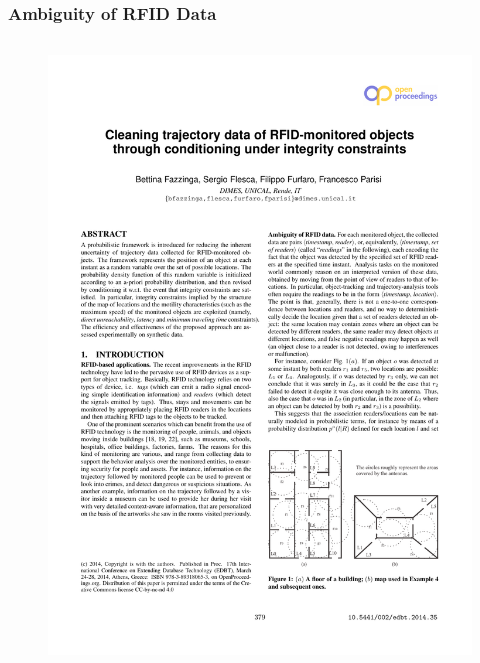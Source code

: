 
\begin{frame}
\frametitle{Ambiguity of RFID Data}

\begin{columns}

  \begin{figure}[tb]
    \includegraphics[width=\columnwidth]{figures/3-4/3-4-1.pdf}
  \end{figure}


\end{columns}
\end{frame}
